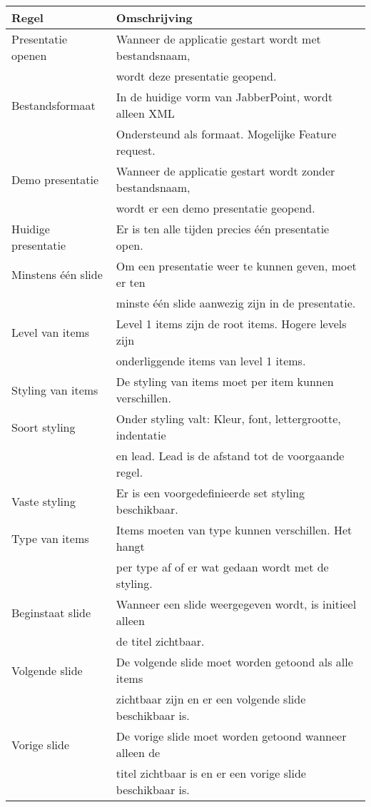 \documentclass[a4paper]{article}
\newcommand{\1}[0]{\'{e}\'{e}n}
\begin{document}
\begin{table}[!h]
\centering
	\begin{tabular}{ll}
	\toprule
 	Regel & Omschrijving \\ \midrule
 	Presentatie openen & Wanneer de applicatie gestart wordt met bestandsnaam, \\& wordt deze presentatie geopend. \\
 	 Bestandsformaat & In de huidige vorm van JabberPoint, wordt alleen XML \\& Ondersteund als formaat. Mogelijke Feature request.\\
 	Demo presentatie & Wanneer de applicatie gestart wordt zonder bestandsnaam, \\& wordt er een demo presentatie geopend.\\
 	Huidige presentatie & Er is ten alle tijden precies \1 presentatie open.\\
 	Minstens \1 slide & Om een presentatie weer te kunnen geven, moet er ten \\& minste \1 slide aanwezig zijn in de presentatie.\\
 	Level van items & Level 1 items zijn de root items. Hogere levels zijn \\& onderliggende items van level 1 items.\\
 	Styling van items & De styling van items moet per item kunnen verschillen.\\
 	Soort styling & Onder styling valt: Kleur, font, lettergrootte, indentatie \\& en lead. Lead is de afstand tot de voorgaande regel.\\
 	Vaste styling & Er is een voorgedefinieerde set styling beschikbaar.\\
 	Type van items & Items moeten van type kunnen verschillen. Het hangt \\& per type af of er wat gedaan wordt met de styling.\\
 	Beginstaat slide & Wanneer een slide weergegeven wordt, is initieel alleen \\& de titel zichtbaar. \\
 	Volgende slide & De volgende slide moet worden getoond als alle items \\& zichtbaar zijn en er een volgende slide beschikbaar is.\\
 	Vorige slide & De vorige slide moet worden getoond wanneer alleen de \\& titel zichtbaar is en er een vorige slide beschikbaar is.\\

\end{tabular}
\end{table}
\end{document}
